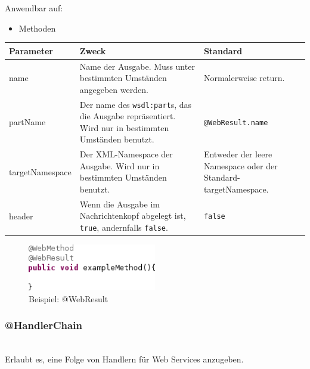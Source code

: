 \documentclass[runningheads]{llncs}
\newcommand{\germanquote}[1]{\glqq{}#1\grqq{}}
\newcommand{\anntabwidth}{\textwidth}
\begin{document}
      \noindent{}Anwendbar auf:
      \begin{itemize}
       \item Methoden\vfill
      \end{itemize}
    \begin{tabulary}{\anntabwidth}{|l|L|L|}
    \hline
    \textbf{Parameter} & \textbf{Zweck} & \textbf{Standard} \\
    \hline
      name &
      Name der Ausgabe. Muss unter bestimmten Umständen angegeben werden. &
      Normalerweise \germanquote{return}. \\
    \hline
      partName &
      Der name des \texttt{wsdl:part}s, das die Ausgabe repräsentiert. Wird nur in bestimmten
      Umständen benutzt. &
      \texttt{@WebResult.name} \\
    \hline
      targetNamespace &
      Der XML-Namespace der Ausgabe. Wird nur in bestimmten Umständen benutzt. &
      Entweder der leere Namespace oder der Standard-targetNamespace. \\
    \hline
      header &
      Wenn die Ausgabe im Nachrichtenkopf abgelegt ist, \texttt{true}, andernfalls \texttt{false}.&
      \texttt{false} \\
    \hline
    \end{tabulary} \vfill
    \begin{figure}[ht!]
      \centering
      \includegraphics[width=0.5\textwidth]{../images/AtWebResult.png}
      \caption{Beispiel: @WebResult}
      \label{fig:wr}
    \end{figure} \vfill

    \subsubsection{@HandlerChain}\ \\
      Erlaubt es, eine Folge von Handlern für Web Services anzugeben.
\end{document}
